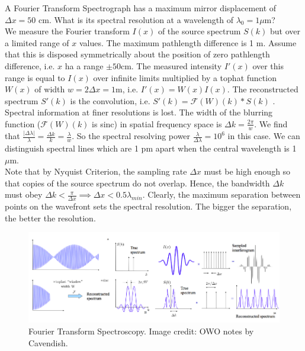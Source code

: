 \documentclass[a4paper]{article}
\begin{document}
\begin{eg}
A Fourier Transform Spectrograph has a maximum mirror displacement of $\Delta x=50$ cm. What is its spectral resolution at a wavelength of $\lambda_0=1\mu$m?\\[5pt]
We measure the Fourier transform $I(x)$ of the source spectrum $S(k)$ but over a limited range of $x$ values. The maximum pathlength difference is 1 m. Assume that this is disposed symmetrically about the position of zero pathlength difference, i.e. $x$ ha a range $\pm50$cm. The measured intensity $I'(x)$ over this range is equal to $I(x)$ over infinite limits multiplied by a tophat function $W(x)$ of width $w=2\Delta x=1$m, i.e. $I'(x)=W(x)I(x)$. The reconstructed spectrum $S'(k)$ is the convolution, i.e. $S'(k)=\mathcal{F}(W)(k)*S(k)$ . Spectral information at finer resolutions is lost. The width of the blurring function ($\mathcal{F}(W)(k)$ is sinc) in spatial frequency space is $\Delta k=\frac{2\pi}{w}$. We find that $\frac{|\Delta\lambda|}{\lambda}=\frac{\Delta k}{k}=\frac{\lambda}{w}$. So the spectral resolving power $\frac{\lambda}{\Delta\lambda}=10^6$ in this case. We can distinguish spectral lines which are 1 pm apart when the central wavelength is 1 $\mu$m.\\[5pt]
Note that by Nyquist Criterion, the sampling rate $\Delta x$ must be high enough so that copies of the source spectrum do not overlap. Hence, the bandwidth $\Delta k$ must obey $\Delta k<\frac{\pi}{\Delta x}\implies\Delta x<0.5\lambda_{min}$. Clearly, the maximum separation between points on the wavefront sets the spectral resolution. The bigger the separation, the better the resolution.
\end{eg}
\begin{figure}[H]
    \centering
    \includegraphics[width=\linewidth]{FTS.PNG}
    \caption{Fourier Transform Spectroscopy. Image credit: OWO notes by Cavendish.}
\end{figure}
\end{document}
